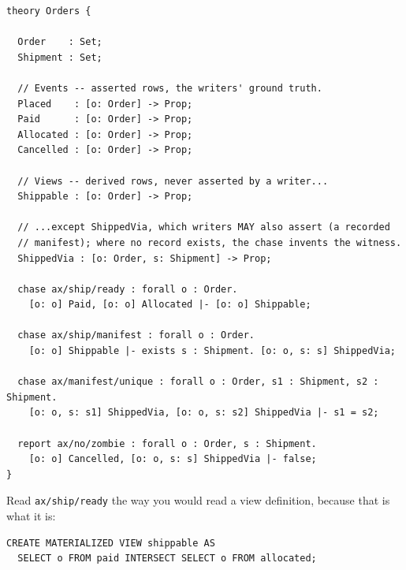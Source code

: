 \begin{Verbatim}[fontsize=\small,frame=leftline,rulecolor=\color{accentmid},framesep=3mm,xleftmargin=3mm]
theory Orders {

  Order    : Set;
  Shipment : Set;

  // Events -- asserted rows, the writers' ground truth.
  Placed    : [o: Order] -> Prop;
  Paid      : [o: Order] -> Prop;
  Allocated : [o: Order] -> Prop;
  Cancelled : [o: Order] -> Prop;

  // Views -- derived rows, never asserted by a writer...
  Shippable : [o: Order] -> Prop;

  // ...except ShippedVia, which writers MAY also assert (a recorded
  // manifest); where no record exists, the chase invents the witness.
  ShippedVia : [o: Order, s: Shipment] -> Prop;

  chase ax/ship/ready : forall o : Order.
    [o: o] Paid, [o: o] Allocated |- [o: o] Shippable;

  chase ax/ship/manifest : forall o : Order.
    [o: o] Shippable |- exists s : Shipment. [o: o, s: s] ShippedVia;

  chase ax/manifest/unique : forall o : Order, s1 : Shipment, s2 : Shipment.
    [o: o, s: s1] ShippedVia, [o: o, s: s2] ShippedVia |- s1 = s2;

  report ax/no/zombie : forall o : Order, s : Shipment.
    [o: o] Cancelled, [o: o, s: s] ShippedVia |- false;
}
\end{Verbatim}

Read \texttt{ax/ship/ready} the way you would read a view definition,
because that is what it is:

\begin{Verbatim}[fontsize=\small,frame=leftline,rulecolor=\color{accentmid},framesep=3mm,xleftmargin=3mm]
CREATE MATERIALIZED VIEW shippable AS
  SELECT o FROM paid INTERSECT SELECT o FROM allocated;
\end{Verbatim}

